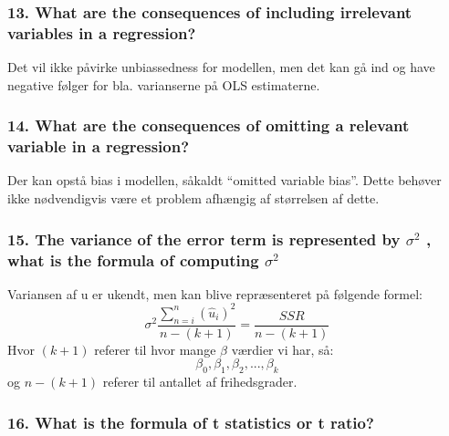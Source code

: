 \documentclass[
  10pt,
]{article}
\begin{document}
\hypertarget{what-are-the-consequences-of-including-irrelevant-variables-in-a-regression}{%
\subsubsection{13. What are the consequences of including irrelevant
variables in a
regression?}\label{what-are-the-consequences-of-including-irrelevant-variables-in-a-regression}}

Det vil ikke påvirke unbiassedness for modellen, men det kan gå ind og
have negative følger for bla. varianserne på OLS estimaterne.

\hypertarget{what-are-the-consequences-of-omitting-a-relevant-variable-in-a-regression}{%
\subsubsection{14. What are the consequences of omitting a relevant
variable in a
regression?}\label{what-are-the-consequences-of-omitting-a-relevant-variable-in-a-regression}}

Der kan opstå bias i modellen, såkaldt ``omitted variable bias''. Dette
behøver ikke nødvendigvis være et problem afhængig af størrelsen af
dette. \newpage

\hypertarget{the-variance-of-the-error-term-is-represented-by-sigma2-what-is-the-formula-of-computing-sigma2}{%
\subsubsection{\texorpdfstring{15. The variance of the error term is
represented by \(\sigma^2\) , what is the formula of computing
\(\sigma^2\)}{15. The variance of the error term is represented by \textbackslash sigma\^{}2 , what is the formula of computing \textbackslash sigma\^{}2}}\label{the-variance-of-the-error-term-is-represented-by-sigma2-what-is-the-formula-of-computing-sigma2}}

Variansen af u er ukendt, men kan blive repræsenteret på følgende
formel:
\[ \sigma^2 \frac{\sum\limits_{n=i}^n(\hat{u}_i)^2}{n-(k+1)}=\frac{SSR}{n-(k+1)}\]
Hvor \((k+1)\) referer til hvor mange \(\beta\) værdier vi har, så:
\[\beta_0,\beta_1,\beta_2,...,\beta_k \] og \(n-(k+1)\) referer til
antallet af frihedsgrader.

\hypertarget{what-is-the-formula-of-t-statistics-or-t-ratio}{%
\subsubsection{16. What is the formula of t statistics or t
ratio?}\label{what-is-the-formula-of-t-statistics-or-t-ratio}}
\end{document}

